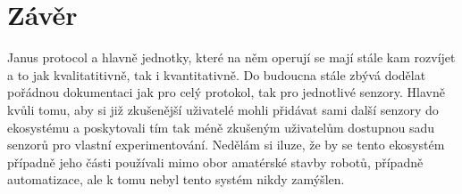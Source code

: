 \newpage
\chapter*{Závěr}

Janus protocol a hlavně jednotky, které na něm operují se mají stále kam rozvíjet a to jak kvalitatitivně, tak i kvantitativně.
Do budoucna stále zbývá dodělat pořádnou dokumentaci jak pro celý protokol, tak pro jednotlivé senzory.
Hlavně kvůli tomu, aby si již zkušenější uživatelé mohli přidávat sami další senzory do ekosystému a poskytovali tím tak méně zkušeným uživatelům dostupnou sadu senzorů pro vlastní experimentování.
Nedělám si iluze, že by se tento ekosystém případně jeho části používali mimo obor amatérské stavby robotů, případně automatizace, ale k tomu nebyl tento systém nikdy zamýšlen.
